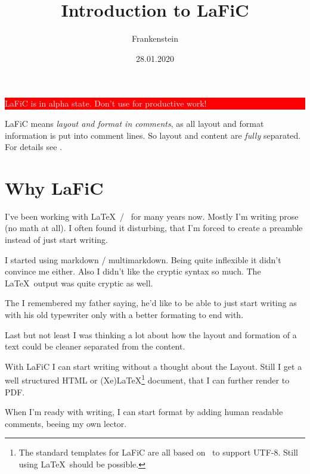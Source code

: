 \documentclass{article}
\date{28.01.2020}
\author{Frankenstein}
\title{Introduction to LaFiC}
\begin{document}
\maketitle


\colorbox{red}{\parbox{\linewidth}{%
\begin{center}
\textcolor{white}{%
LaFiC is in alpha state. Don't use for productive work!}
\end{center}

}
}

{LaFiC means \textit{layout and format in comments}, as all layout and
format information is put into comment lines. So layout and
content are \emph{fully} separated. For details see \xspace .\\}

\section{Why LaFiC}

{I've been working with \LaTeX\  / \XeLaTeX\  for many years
now. Mostly I'm writing prose (no math at all). I often
found it disturbing, that I'm forced to create a preamble
instead of just start writing.\\}

{I started using markdown / multimarkdown. Being quite
inflexible it didn't convince me either. Also I didn't like
the cryptic syntax so much. The \LaTeX\  output was quite
cryptic as well.\\}

{The I remembered my father saying, he'd like to be able to
just start writing as with his old typewriter only with a
better formating to end with.\\}

{Last but not least I was thinking a lot about how the layout
and formation of a text could be cleaner separated from the
content.\\}

{With LaFiC I can start writing without a thought about the
Layout. Still I get a well structured HTML or (Xe)LaTeX\footnote{The standard templates for LaFiC are all based on \XeLaTeX\  to support UTF-8. Still using \LaTeX\  should be possible.}\xspace 
document, that I can further render to PDF.\\}

{When I'm ready with writing, I can start format by
adding human readable comments, beeing my own lector.\\}
\end{document}
